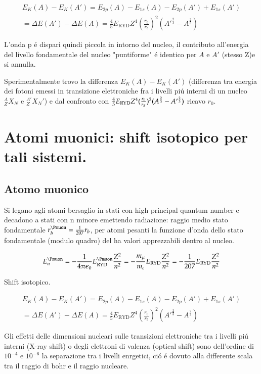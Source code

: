 \documentclass[main.tex]{subfiles}
\begin{document}
\begin{align*}
E_K(A)-E_K(A')=E_{2p}(A)-E_{1s}(A)-E_{2p}(A')+E_{1s}(A')\\
=\Delta E(A')-\Delta E(A)=\frac{4}{5}E_{\text{RYD}}Z^4(\frac{r_0}{r_b})^2(A'^{\frac{2}{3}}-A^{\frac{2}{3}})
\end{align*}


L'onda p \'e dispari quindi piccola in intorno del nucleo, il contributo all'energia del livello fondamentale del nucleo "puntiforme" \'e identico per $A$ e $A'$ (stesso Z)e si annulla.

Sperimentalmente trovo la differenza $E_K(A)-E_K(A')$ (differenza tra energia dei fotoni emessi in transizione elettroniche fra i livelli pi\'u interni di un nucleo $^A_ZX_N$ e $^{A'}_ZX_N'$) e dal confronto con $\frac{4}{5}E_{\text{RYD}} Z^4(\frac{r_0}{r_B})^2(A^{\frac{2}{3}}-A'^{\frac{2}{3}})$ ricavo $r_0$.

 \section{Atomi muonici: shift isotopico per tali sistemi.}
 
\subsection{Atomo muonico}
Si legano agli atomi bersaglio in stati con high principal quantum number e  decadono a stati con n minore emettendo radiazione: raggio medio stato fondamentale $r_b^{\Pmuon}=\frac{1}{207}r_b$, per atomi pesanti la funzione d'onda dello stato fondamentale (modulo quadro) del \Pmuon ha valori apprezzabili dentro al nucleo.

\begin{align*}
E_n^{\Pmuon}=-\frac{1}{4\pi\epsilon_0}\ER^{\Pmuon}\frac{Z^2}{n^2}=-\frac{m_{\mu}}{m_e}\ER\frac{Z^2}{n^2}=-\frac{1}{207}\ER\frac{Z^2}{n^2}
\end{align*}

Shift isotopico.

\begin{align*}
E_K(A)-E_K(A')=E_{2p}(A)-E_{1s}(A)-E_{2p}(A')+E_{1s}(A')\\
=\Delta E(A')-\Delta E(A)=\frac{4}{5}E_{\text{RYD}}Z^4(\frac{r_0}{r_b})^2(A'^{\frac{2}{3}}-A^{\frac{2}{3}})
\end{align*}

Gli effetti delle dimensioni nucleari sulle transizioni elettroniche tra i livelli pi\'u interni (X-ray shift) o degli elettroni di valenza (optical shift) sono dell'ordine di $10^{-4}$ e $10^{-6}$ la separazione tra i livelli enrgetici, ci\'o \'e dovuto alla differente scala tra il raggio di bohr e il raggio nucleare.
\end{document}
